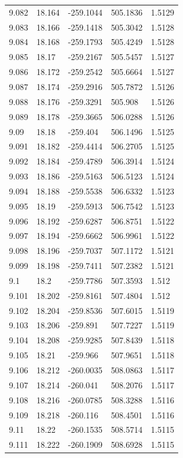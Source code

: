 \begin{tabular}{lllll}
9.082 & 18.164 & -259.1044 & 505.1836 & 1.5129 \\
9.083 & 18.166 & -259.1418 & 505.3042 & 1.5128 \\
9.084 & 18.168 & -259.1793 & 505.4249 & 1.5128 \\
9.085 & 18.17 & -259.2167 & 505.5457 & 1.5127 \\
9.086 & 18.172 & -259.2542 & 505.6664 & 1.5127 \\
9.087 & 18.174 & -259.2916 & 505.7872 & 1.5126 \\
9.088 & 18.176 & -259.3291 & 505.908 & 1.5126 \\
9.089 & 18.178 & -259.3665 & 506.0288 & 1.5126 \\
9.09 & 18.18 & -259.404 & 506.1496 & 1.5125 \\
9.091 & 18.182 & -259.4414 & 506.2705 & 1.5125 \\
9.092 & 18.184 & -259.4789 & 506.3914 & 1.5124 \\
9.093 & 18.186 & -259.5163 & 506.5123 & 1.5124 \\
9.094 & 18.188 & -259.5538 & 506.6332 & 1.5123 \\
9.095 & 18.19 & -259.5913 & 506.7542 & 1.5123 \\
9.096 & 18.192 & -259.6287 & 506.8751 & 1.5122 \\
9.097 & 18.194 & -259.6662 & 506.9961 & 1.5122 \\
9.098 & 18.196 & -259.7037 & 507.1172 & 1.5121 \\
9.099 & 18.198 & -259.7411 & 507.2382 & 1.5121 \\
9.1 & 18.2 & -259.7786 & 507.3593 & 1.512 \\
9.101 & 18.202 & -259.8161 & 507.4804 & 1.512 \\
9.102 & 18.204 & -259.8536 & 507.6015 & 1.5119 \\
9.103 & 18.206 & -259.891 & 507.7227 & 1.5119 \\
9.104 & 18.208 & -259.9285 & 507.8439 & 1.5118 \\
9.105 & 18.21 & -259.966 & 507.9651 & 1.5118 \\
9.106 & 18.212 & -260.0035 & 508.0863 & 1.5117 \\
9.107 & 18.214 & -260.041 & 508.2076 & 1.5117 \\
9.108 & 18.216 & -260.0785 & 508.3288 & 1.5116 \\
9.109 & 18.218 & -260.116 & 508.4501 & 1.5116 \\
9.11 & 18.22 & -260.1535 & 508.5714 & 1.5115 \\
9.111 & 18.222 & -260.1909 & 508.6928 & 1.5115 \\

\end{tabular}
